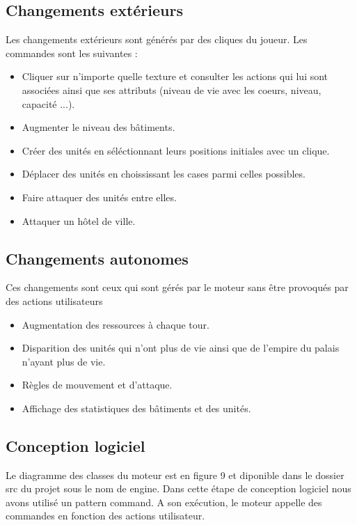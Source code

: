 \documentclass[12pt,a4paper]{article}
\begin{document}
\subsection{Changements extérieurs}
Les changements extérieurs sont générés par des cliques du joueur. Les commandes sont les suivantes : 
\begin{itemize}
\item Cliquer sur n'importe quelle texture et consulter les actions qui lui sont associées ainsi que ses attributs (niveau de vie avec les coeurs, niveau, capacité ...).
\item Augmenter le niveau des bâtiments.
\item Créer des unités en séléctionnant leurs positions initiales avec un clique.
\item Déplacer des unités en choississant les cases parmi celles possibles.
\item Faire attaquer des unités entre elles.
\item Attaquer un hôtel de ville.
\end{itemize}

\subsection{Changements autonomes}
Ces changements sont ceux qui sont gérés par le moteur sans être provoqués par des actions utilisateurs
\begin{itemize}
\item Augmentation des ressources à chaque tour.
\item Disparition des unités qui n'ont plus de vie ainsi que de l'empire du palais n'ayant plus de vie.
\item Règles de mouvement et d'attaque.
\item Affichage des statistiques des bâtiments et des unités.
\end{itemize}


\subsection{Conception logiciel}
Le diagramme des classes du moteur est en figure 9 et diponible dans le dossier src du projet sous le nom de engine.
Dans cette étape de conception logiciel nous avons utilisé un pattern command. A son exécution, le moteur appelle des commandes en fonction des actions utilisateur.\\
\end{document}
